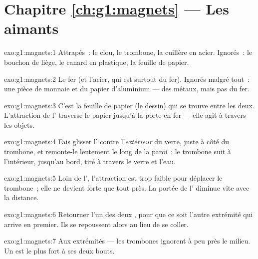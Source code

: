 \section*{Chapitre \ref{ch:g1:magnets} --- Les aimants}

\begin{solution}{exo:g1:magnets:1}
Attrapés~: le clou, le trombone, la cuillère en acier. Ignorés~: le
bouchon de liège, le canard en plastique, la feuille de papier.
\end{solution}

\begin{solution}{exo:g1:magnets:2}
Le fer (et l'acier, qui est surtout du fer). Ignorés malgré tout~:
une pièce de monnaie et du papier d'aluminium --- des métaux, mais
pas du fer.
\end{solution}

\begin{solution}{exo:g1:magnets:3}
C'est la feuille de papier (le dessin) qui se trouve entre les deux.
L'attraction de l' traverse le papier jusqu'à la porte en fer
--- elle agit à travers les objets.
\end{solution}

\begin{solution}{exo:g1:magnets:4}
Fais glisser l' contre l'\emph{extérieur} du verre, juste à
côté du trombone, et remonte-le lentement le long de la paroi~: le
trombone suit à l'intérieur, jusqu'au bord, tiré à travers le verre
et l'eau.
\end{solution}

\begin{solution}{exo:g1:magnets:5}
Loin de l', l'attraction est trop faible pour déplacer le
trombone~; elle ne devient forte que tout près. La portée de l'
diminue vite avec la distance.
\end{solution}

\begin{solution}{exo:g1:magnets:6}
Retourner l'un des deux , pour que ce soit l'autre extrémité
qui arrive en premier. Ils se repoussent alors au lieu de se coller.
\end{solution}

\begin{solution}{exo:g1:magnets:7}
Aux extrémités --- les trombones ignorent à peu près le milieu. Un
 est le plus fort à ses deux bouts.
\end{solution}

